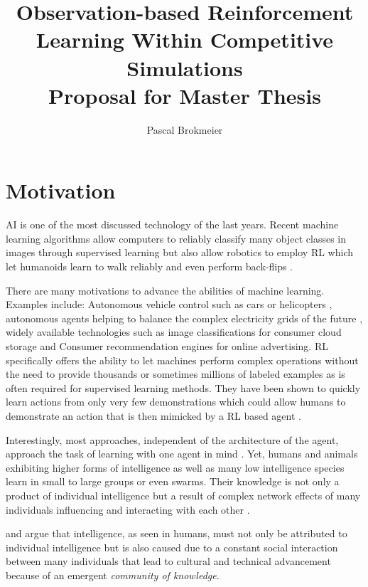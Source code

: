 \documentclass[12pt,a4paper]{article}
\title{Observation-based Reinforcement Learning Within Competitive Simulations\\ \small{Proposal for Master Thesis}}
\author{Pascal Brokmeier}
\begin{document}
  \maketitle

\section{Motivation}

\ac{AI} is one of the most discussed technology of the last years. Recent machine learning algorithms allow computers to
reliably classify many object classes in images \cite{krizhevsky2012imagenet} through supervised learning but also allow
robotics to employ \ac{RL} which let humanoids learn to walk reliably and even perform back-flips
\cite{proximalpolicyopt}.

There are many motivations to advance the abilities of machine learning. Examples include: Autonomous vehicle control
such as cars or helicopters \cite{abbeel2010autonomous}, autonomous agents helping to balance the complex electricity
grids of the future \cite{peters2013reinforcement}, widely available technologies such as image classifications for
consumer cloud storage and Consumer recommendation engines for online advertising. \ac{RL} specifically offers the
ability to let machines perform complex operations without the need to provide thousands or sometimes millions of
labeled examples as is often required for supervised learning methods. They have been shown to quickly learn actions
from only very few demonstrations which could allow humans to demonstrate an action that is then mimicked by a \ac{RL}
based agent \cite{duan2017one}.

Interestingly, most approaches, independent of the architecture of the agent, approach the task of learning with one
agent in mind \cite[p.694ff]{russell2016artificial}. Yet, humans and animals exhibiting higher forms of intelligence as
well as many low intelligence species learn in small to large groups or even swarms. Their knowledge is not only a
product of individual intelligence but a result of complex network effects of many individuals influencing and
interacting with each other \cite[p.200f]{sloman2017knowledge}.

\cite{sloman2017knowledge} and \cite{wegner1995computer} argue that intelligence, as seen in humans, must not only be
attributed to individual intelligence but is also caused due to a constant social interaction between many individuals
that lead to cultural and technical advancement because of an emergent \emph{community of knowledge}.
\end{document}
